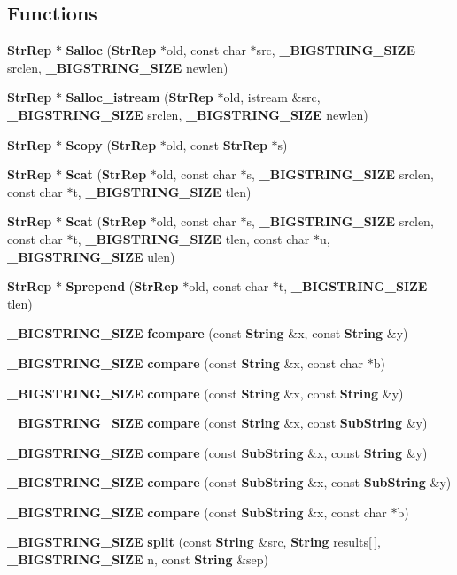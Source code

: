 \subsection*{Functions}
\begin{CompactItemize}
\item 
{\bf Str\-Rep} $\ast$ {\bf Salloc} ({\bf Str\-Rep} $\ast$old, const char $\ast$src, {\bf \_\-BIGSTRING\_\-SIZE} srclen, {\bf \_\-BIGSTRING\_\-SIZE} newlen)
\item 
{\bf Str\-Rep} $\ast$ {\bf Salloc\_\-istream} ({\bf Str\-Rep} $\ast$old, istream \&src, {\bf \_\-BIGSTRING\_\-SIZE} srclen, {\bf \_\-BIGSTRING\_\-SIZE} newlen)
\item 
{\bf Str\-Rep} $\ast$ {\bf Scopy} ({\bf Str\-Rep} $\ast$old, const {\bf Str\-Rep} $\ast$s)
\item 
{\bf Str\-Rep} $\ast$ {\bf Scat} ({\bf Str\-Rep} $\ast$old, const char $\ast$s, {\bf \_\-BIGSTRING\_\-SIZE} srclen, const char $\ast$t, {\bf \_\-BIGSTRING\_\-SIZE} tlen)
\item 
{\bf Str\-Rep} $\ast$ {\bf Scat} ({\bf Str\-Rep} $\ast$old, const char $\ast$s, {\bf \_\-BIGSTRING\_\-SIZE} srclen, const char $\ast$t, {\bf \_\-BIGSTRING\_\-SIZE} tlen, const char $\ast$u, {\bf \_\-BIGSTRING\_\-SIZE} ulen)
\item 
{\bf Str\-Rep} $\ast$ {\bf Sprepend} ({\bf Str\-Rep} $\ast$old, const char $\ast$t, {\bf \_\-BIGSTRING\_\-SIZE} tlen)
\item 
{\bf \_\-BIGSTRING\_\-SIZE} {\bf fcompare} (const {\bf String} \&x, const {\bf String} \&y)
\item 
{\bf \_\-BIGSTRING\_\-SIZE} {\bf compare} (const {\bf String} \&x, const char $\ast$b)
\item 
{\bf \_\-BIGSTRING\_\-SIZE} {\bf compare} (const {\bf String} \&x, const {\bf String} \&y)
\item 
{\bf \_\-BIGSTRING\_\-SIZE} {\bf compare} (const {\bf String} \&x, const {\bf Sub\-String} \&y)
\item 
{\bf \_\-BIGSTRING\_\-SIZE} {\bf compare} (const {\bf Sub\-String} \&x, const {\bf String} \&y)
\item 
{\bf \_\-BIGSTRING\_\-SIZE} {\bf compare} (const {\bf Sub\-String} \&x, const {\bf Sub\-String} \&y)
\item 
{\bf \_\-BIGSTRING\_\-SIZE} {\bf compare} (const {\bf Sub\-String} \&x, const char $\ast$b)
\item 
{\bf \_\-BIGSTRING\_\-SIZE} {\bf split} (const {\bf String} \&src, {\bf String} results[$\,$], {\bf \_\-BIGSTRING\_\-SIZE} n, const {\bf String} \&sep)

\end{CompactItemize}

